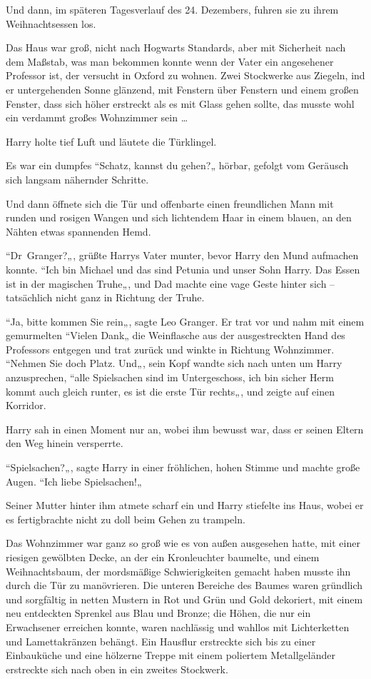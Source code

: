 {Und dann, im späteren Tagesverlauf des 24. Dezembers, fuhren sie zu ihrem Weihnachtsessen los.

Das Haus war groß, nicht nach Hogwarts Standards, aber mit Sicherheit nach dem Maßstab, was man bekommen konnte wenn der Vater ein angesehener Professor ist, der versucht in Oxford zu wohnen. Zwei Stockwerke aus Ziegeln, ind er untergehenden Sonne glänzend, mit Fenstern über Fenstern und einem großen Fenster, dass sich höher erstreckt als es mit Glass gehen sollte, das musste wohl ein verdammt großes Wohnzimmer sein …

Harry holte tief Luft und läutete die Türklingel.

Es war ein dumpfes “Schatz, kannst du gehen?„ hörbar, gefolgt vom Geräusch sich langsam nähernder Schritte.

Und dann öffnete sich die Tür und offenbarte einen freundlichen Mann mit runden und rosigen Wangen und sich lichtendem Haar in einem blauen, an den Nähten etwas spannenden Hemd.

“Dr~Granger?„, grüßte Harrys Vater munter, bevor Harry den Mund aufmachen konnte. “Ich bin Michael und das sind Petunia und unser Sohn Harry. Das Essen ist in der magischen Truhe„, und Dad machte eine vage Geste hinter sich -- tatsächlich nicht ganz in Richtung der Truhe.

“Ja, bitte kommen Sie rein„, sagte Leo Granger. Er trat vor und nahm mit einem gemurmelten “Vielen Dank„ die Weinflasche aus der ausgestreckten Hand des Professors entgegen und trat zurück und winkte in Richtung Wohnzimmer. “Nehmen Sie doch Platz. Und„, sein Kopf wandte sich nach unten um Harry anzusprechen, “alle Spielsachen sind im Untergeschoss, ich bin sicher Herm kommt auch gleich runter, es ist die erste Tür rechts„, und zeigte auf einen Korridor.

Harry sah in einen Moment nur an, wobei ihm bewusst war, dass er seinen Eltern den Weg hinein versperrte.

“Spielsachen?„, sagte Harry in einer fröhlichen, hohen Stimme und machte große Augen. “Ich liebe Spielsachen!„

Seiner Mutter hinter ihm atmete scharf ein und Harry stiefelte ins Haus, wobei er es fertigbrachte nicht zu doll beim Gehen zu trampeln.

Das Wohnzimmer war ganz so groß wie es von außen ausgesehen hatte, mit einer riesigen gewölbten Decke, an der ein Kronleuchter baumelte, und einem Weihnachtsbaum, der mordsmäßige Schwierigkeiten gemacht haben musste ihn durch die Tür zu manövrieren. Die unteren Bereiche des Baumes waren gründlich und sorgfältig in netten Mustern in Rot und Grün und Gold dekoriert, mit einem neu entdeckten Sprenkel aus Blau und Bronze; die Höhen, die nur ein Erwachsener erreichen konnte, waren nachlässig und wahllos mit Lichterketten und Lamettakränzen behängt. Ein Hausflur erstreckte sich bis zu einer Einbauküche und eine hölzerne Treppe mit einem poliertem Metallgeländer erstreckte sich nach oben in ein zweites Stockwerk.

}
